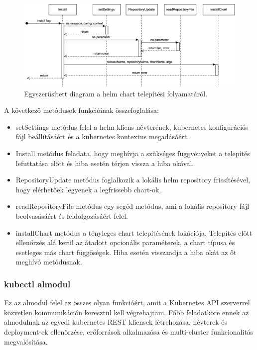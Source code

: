 \begin{figure}[ht]
    \centering
         \includegraphics[width=1.0\textwidth]{figures/kli/helm-simple-sequence.png}
          \caption{Egyszerűsített diagram a helm chart telepítési folyamatáról.}
           \label{helm-simple-sequence}
\end{figure}

A következő metódusok funkcióinak összefoglalása:
\begin{itemize}
    \item setSettings metódus felel a helm kliens névterének, kubernetes konfigurációs fájl beállításáért és a kubernetes kontextus megadásáért.
    \item Install metódus feladata, hogy meghívja a szükséges függvényeket a telepítés lefuttatása előtt és hiba esetén térjen vissza a hiba okával.
    \item RepositoryUpdate metódus foglalkozik a lokális helm repository frissítésével, hogy elérhetőek legyenek a legfrissebb chart-ok.
    \item readRepositoryFile metódus egy segéd metódus, ami a lokális repository fájl beolvasásáért és feldolgozásáért felel.
    \item installChart metódus a tényleges chart telepítésének lokációja. Telepítés előtt ellenőrzés alá kerül az átadott opcionális paraméterek, a chart típusa és esetleges más chart függőségek. Hiba esetén visszaadja a hiba okát az őt meghívó metódusnak.
\end{itemize}

\subsubsection*{kubectl almodul}
Ez az almodul felel az összes olyan funkcióért, amit a Kubernetes API szerverrel közvetlen kommunikáción keresztül kell végrehajtani.
Főbb feladatköre ennek az almodulnak az egyedi kubernetes REST kliensek létrehozása, névterek és deployment-ek ellenőrzése, erőforrások alkalmazása és multi-cluster funkcionalitás megvalósítása.

